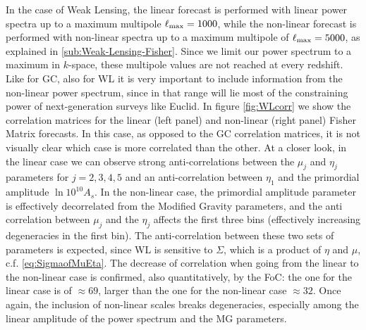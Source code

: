 In the case of Weak Lensing, the linear forecast is performed with
linear power spectra up to a maximum multipole $\ell_{\rm max}=1000$,
while the non-linear forecast is performed with non-linear spectra
up to a maximum multipole of $\ell_{\rm max}=5000$, as explained in
 \cref{sub:Weak-Lensing-Fisher}. Since we limit 
our power spectrum to a maximum in $k$-space, these multipole values are not reached at every redshift.
Like for GC, also for WL it is very important
to include information from the non-linear power spectrum, since in
that range will lie most of the constraining power of next-generation
surveys like Euclid. In figure \cref{fig:WLcorr} we show the correlation
matrices for the linear (left panel) and non-linear (right panel)
Fisher Matrix forecasts. In this case, as opposed to the GC correlation matrices, it is not visually 
clear which case is more correlated than the other.
At a closer look, in the linear case we can observe strong anti-correlations between the $\mu_{j}$ and $\eta_{j}$ parameters for 
$j={2,3,4,5}$ and an anti-correlation between $\eta_{1}$ and the primordial amplitude $\ln10^{10}A_{s}$.
In the non-linear case, the primordial amplitude parameter is effectively decorrelated from the Modified Gravity parameters,
and the anti correlation between $\mu_{j}$ and the $\eta_{j}$ affects the first three bins (effectively increasing degeneracies in the first bin).
The anti-correlation between these two sets of parameters
is expected, since WL is sensitive to $\Sigma$, which is a product of $\eta$ and $\mu$, c.f. \cref{eq:SigmaofMuEta}.
The decrease of correlation when going from the linear to the non-linear case is confirmed, also quantitatively, by the FoC: the one for the linear case is of $\approx 69$, larger than the one for the non-linear case $\approx 32$. Once again, the inclusion of non-linear scales breaks degeneracies, especially among the linear amplitude of the power spectrum and the MG parameters. 

